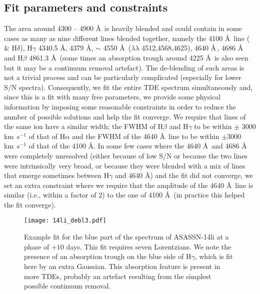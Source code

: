 \documentclass[structabstract]{aa}
\begin{document}
\subsection{Fit parameters and constraints}\label{subsub:fpac}
The area around 4300 -- 4900 \AA\, is heavily blended and could contain in some cases as many as nine different lines blended together, namely the 4100 \AA\, line ( \& H$\delta$), H$\gamma$ 4340.5 \AA,  4379 \AA,  $\sim$ 4550 \AA\, ($\lambda\lambda$ 4512,4568,4625),  4640 \AA\,,  4686 \AA\, and H$\beta$ 4861.3 \AA\, (some times an absorption trough around 4225 \AA\, is also seen but it may be a continuum removal artefact). 
The de-blending of such areas is not a trivial process and can be particularly complicated (especially for lower S/N spectra). Consequently, we fit the entire TDE spectrum simultaneously and, since this is a fit with many free parameters, we provide some physical information by imposing some reasonable constraints in order to reduce the number of possible solutions and help the fit converge. We require that lines of the same ion have a similar width; the FWHM of H$\beta$ and H$\gamma$ to be within $\pm$ 3000 km~s$^{-1}$ of that of H$\alpha$ and the FWHM of the  4640 \AA\, line to be within $\pm 3000$ km~s$^{-1}$ of that of the  4100 \AA. In some few cases where the  4640 \AA\, and  4686 \AA\, were completely unresolved (either because of low S/N or because the two lines were intrinsically very broad, or because they were blended with a mix of lines that emerge sometimes between H$\gamma$ and  4640 \AA) and the fit did not converge, we set an extra constraint where we require that the amplitude of the  4640 \AA\, line is similar (i.e., within a factor of 2) to the one of  4100 \AA\, (in practice this helped the fit converge).

\begin{figure}
\centering
\texttt{[image: 14li\_debl3.pdf]}
\caption{Example fit for the blue part of the spectrum of ASASSN-14li at a phase of $+10$ days. This fit requires seven Lorentzians. We note the presence of an absorption trough on the blue side of H$\gamma$, which is fit here by an extra Gaussian. This absorption feature is present in more TDEs, probably an artefact resulting from the simplest possible continuum removal.
}\label{fig:debl_fit}
\end{figure}
\end{document}
